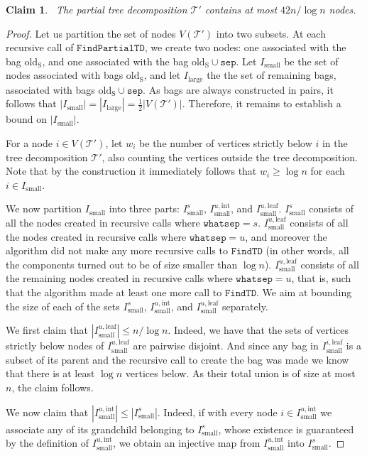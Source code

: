 \documentclass[a4paper,11pt]{article}
\newtheorem{claim}[lemma]{Claim}
\theoremstyle{definition}
\theoremstyle{remark}
\newcommand{\findTD}{\mathtt{FindTD}}
\newcommand{\findPTD}{\mathtt{FindPartialTD}}
\newcommand{\whatsep}{\mathtt{whatsep}}
\newcommand{\oldS}{\mathrm{old_S}}
\newcommand{\sep}{\mathtt{sep}}
\newcommand{\td}{\mathcal{T}} \newcommand{\tw}{\mathrm{tw}} \newcommand{\w}{\mathrm{w}}
\begin{document}
\newcommand{\sm}{\textrm{small}}
\newcommand{\lr}{\textrm{large}}
\newcommand{\inte}{\textrm{int}}
\newcommand{\leaf}{\textrm{leaf}}

\begin{claim}~\label{claim:sublinear-bags} The partial tree
  decomposition $\td'$ contains at most $42n / \log n$ nodes.
\end{claim}
\begin{proof}
  Let us partition the set of nodes $V(\td')$ into two subsets.  At
  each recursive call of $\findPTD$, we create two nodes: one
  associated with the bag $\oldS$, and one associated with the bag
  $\oldS\cup \sep$.  Let $I_\sm$ be the set of nodes associated with
  bags $\oldS$, and let $I_\lr$ the the set of remaining bags,
  associated with bags $\oldS\cup \sep$.  As bags are always
  constructed in pairs, it follows that
  $|I_\sm|=|I_\lr|=\frac{1}{2}|V(\td')|$.  Therefore, it remains to
  establish a bound on $|I_\sm|$.
  
  For a node $i\in V(\td')$, let $w_i$ be the number of vertices
  strictly below $i$ in the tree decomposition $\td'$, also counting
  the vertices outside the tree decomposition.  Note that by the
  construction it immediately follows that $w_i\geq \log n$ for each
  $i\in I_\sm$.
  
  We now partition $I_\sm$ into three parts: $I_\sm^s$,
  $I_\sm^{u,\inte}$, and $I_\sm^{u,\leaf}$.  $I_\sm^s$ consists of all
  the nodes created in recursive calls where $\whatsep=s$.
  $I_\sm^{u,\leaf}$ consists of all the nodes created in recursive
  calls where $\whatsep=u$, and moreover the algorithm did not make
  any more recursive calls to $\findTD$ (in other words, all the
  components turned out to be of size smaller than $\log n$).
  $I_\sm^{u,\leaf}$ consists of all the remaining nodes created in
  recursive calls where $\whatsep=u$, that is, such that the algorithm
  made at least one more call to $\findTD$.  We aim at bounding the
  size of each of the sets $I_\sm^s$, $I_\sm^{u,\inte}$, and
  $I_\sm^{u,\leaf}$ separately.
  
  We first claim that $|I_\sm^{u,\leaf}|\leq n / \log n$.  Indeed, we
  have that the sets of vertices strictly below nodes of
  $I_\sm^{u,\leaf}$ are pairwise disjoint.
  And since any bag in $I_\sm^{i,\leaf}$ is a subset of its parent and the
  recursive call to create the bag was made we know that there is at least
  $\log n$ vertices below. As their total union is of size at most $n$, the
  claim follows.
  
  We now claim that $|I_\sm^{u,\inte}|\leq |I_\sm^{s}|$.  Indeed, if with
  every node $i\in I_\sm^{u,\inte}$ we associate any of its grandchild
  belonging to $I_\sm^{s}$, whose existence is guaranteed by the
  definition of $I_\sm^{u,\inte}$, we obtain an injective map from
  $I_\sm^{u,\inte}$ into $I_\sm^{s}$.
  

\end{proof}
\end{document}
